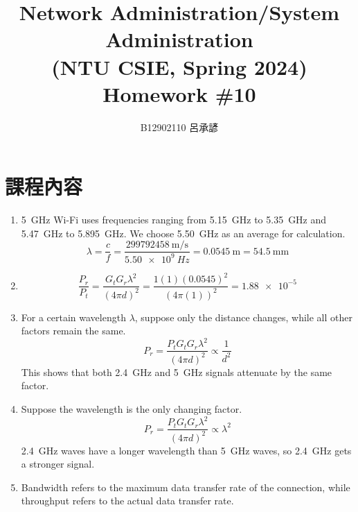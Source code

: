 \documentclass[12pt, a4paper]{article}
\title{
  \vspace{-1cm}
  Network Administration/System Administration\\
  (NTU CSIE, Spring 2024)\\
  Homework \#10
}
\author{\Large B12902110 呂承諺}
\begin{document}
  \maketitle
  \section{課程內容}
  \begin{enumerate}[label=(\alph*)]
    \item 5~GHz Wi-Fi uses frequencies ranging from \qty{5.15}{\giga\hertz} to
    \qty{5.35}{\giga\hertz} and \qty{5.47}{\giga\hertz} to \qty{5.895}{\giga\hertz}.
    We choose \qty{5.50}{\giga\hertz} as an average for calculation.
    \[
      \lambda = \frac{c}{f}
      = \frac{\qty{299792458}{\meter/\second}}{\qty{5.50e9}{Hz}}
      = \qty{0.0545}{\meter} = \qty{54.5}{\milli\meter}
    \]

    \item
    \[
      \frac{P_r}{P_t} = \frac{G_tG_r\lambda^2}{\left(4\pi d\right)^2}
      = \frac{1 \left(1\right) \left(0.0545\right)^2}{\left(4\pi \left(1\right) \right)^2}
      = \num{1.88e-5}
    \]

    \item For a certain wavelength $\lambda$, suppose only the distance changes, while
    all other factors remain the same.
    \[
      P_r = \frac{P_t G_t G_r \lambda^2}{\left(4 \pi d\right)^2} \propto \frac{1}{d^2}
    \]
    This shows that both 2.4~GHz and 5~GHz signals attenuate by the same factor.

    \item Suppose the wavelength is the only changing factor.
    \[
      P_r = \frac{P_t G_t G_r \lambda^2}{\left(4 \pi d\right)^2} \propto \lambda^2
    \]
    2.4~GHz waves have a longer wavelength than 5~GHz waves, so 2.4~GHz gets a stronger
    signal.

    \item Bandwidth refers to the maximum data transfer rate of the connection, while
    throughput refers to the actual data transfer rate.
  \end{enumerate}
\end{document}
